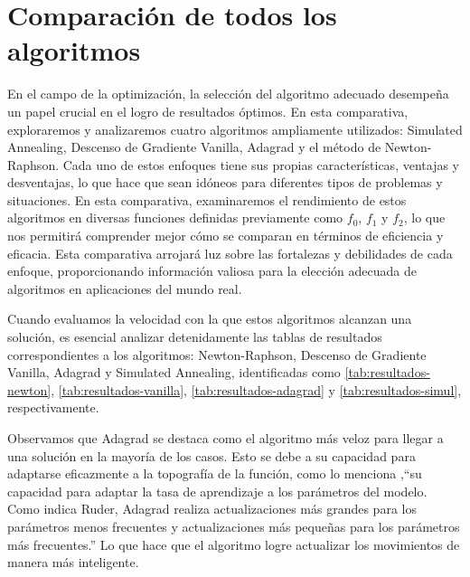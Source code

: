 \documentclass{article}
\begin{document}
\section{Comparación de todos los algoritmos}

En el campo de la optimización, la selección del algoritmo adecuado desempeña un papel crucial en el logro de resultados óptimos. En esta comparativa, exploraremos y analizaremos cuatro algoritmos ampliamente utilizados: Simulated Annealing, Descenso de Gradiente Vanilla, Adagrad y el método de Newton-Raphson. Cada uno de estos enfoques tiene sus propias características, ventajas y desventajas, lo que hace que sean idóneos para diferentes tipos de problemas y situaciones. En esta comparativa, examinaremos el rendimiento de estos algoritmos en diversas funciones definidas previamente como $f_0$, $f_1$ y $f_2$, lo que nos permitirá comprender mejor cómo se comparan en términos de eficiencia y eficacia. Esta comparativa arrojará luz sobre las fortalezas y debilidades de cada enfoque, proporcionando información valiosa para la elección adecuada de algoritmos en aplicaciones del mundo real.

Cuando evaluamos la velocidad con la que estos algoritmos alcanzan una solución, es esencial analizar detenidamente las tablas de resultados correspondientes a los algoritmos: Newton-Raphson, Descenso de Gradiente Vanilla, Adagrad y Simulated Annealing, identificadas como \ref{tab:resultados-newton}, \ref{tab:resultados-vanilla}, \ref{tab:resultados-adagrad} y \ref{tab:resultados-simul}, respectivamente.

Observamos que Adagrad se destaca como el algoritmo más veloz para llegar a una solución en la mayoría de los casos. Esto se debe a su capacidad para adaptarse eficazmente a la topografía de la función, como lo menciona ,``su capacidad para adaptar la tasa de aprendizaje a los parámetros del modelo. Como indica Ruder, Adagrad realiza actualizaciones más grandes para los parámetros menos frecuentes y actualizaciones más pequeñas para los parámetros más frecuentes.''
Lo que hace que el algoritmo logre actualizar los movimientos de manera más inteligente. 
\end{document}
